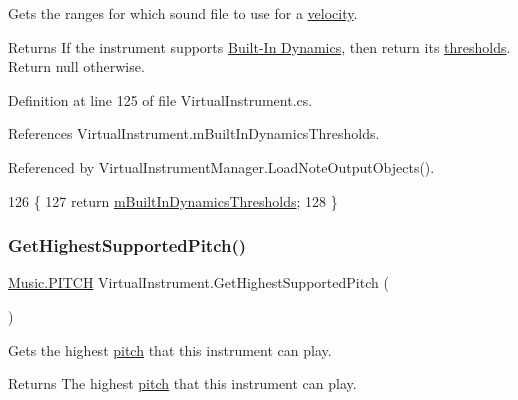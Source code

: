 Gets the ranges for which sound file to use for a \hyperlink{group___audio_DefVel}{velocity}. 

\begin{DoxyReturn}{Returns}
If the instrument supports \hyperlink{group___audio_DefBID}{Built-\/\+In Dynamics}, then return its \hyperlink{group___audio_DefBIDThresh}{thresholds}. Return null otherwise. 
\end{DoxyReturn}


Definition at line 125 of file Virtual\+Instrument.\+cs.



References Virtual\+Instrument.\+m\+Built\+In\+Dynamics\+Thresholds.



Referenced by Virtual\+Instrument\+Manager.\+Load\+Note\+Output\+Objects().


\begin{DoxyCode}
126     \{
127         \textcolor{keywordflow}{return} \hyperlink{group___v_i_base_pro_var_gae3db4264dc2a96e99ea680c6d637e6bf}{mBuiltInDynamicsThresholds};
128     \}
\end{DoxyCode}
\mbox{\label{group___v_i_base_pub_func_ga859f3e73b1d28051cecf0ecd1c8b10ee}} 
\subsubsection{\texorpdfstring{Get\+Highest\+Supported\+Pitch()}{GetHighestSupportedPitch()}}
{\footnotesize\ttfamily \hyperlink{group___music_enums_ga508f69b199ea518f935486c990edac1d}{Music.\+P\+I\+T\+CH} Virtual\+Instrument.\+Get\+Highest\+Supported\+Pitch (\begin{DoxyParamCaption}{ }\end{DoxyParamCaption})}



Gets the highest \hyperlink{group___music_enums_ga508f69b199ea518f935486c990edac1d}{pitch} that this instrument can play. 

\begin{DoxyReturn}{Returns}
The highest \hyperlink{group___music_enums_ga508f69b199ea518f935486c990edac1d}{pitch} that this instrument can play. 
\end{DoxyReturn}


